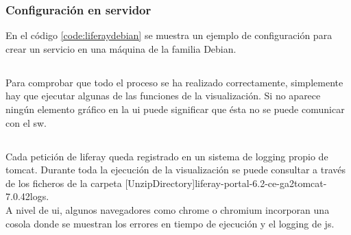 \subsubsection*{Configuración en servidor}
En el código \ref{code:liferaydebian} se muestra un ejemplo de configuración para crear un servicio en una máquina de la familia Debian.

\subsection{}
Para comprobar que todo el proceso se ha realizado correctamente, simplemente hay que ejecutar algunas de las funciones de la visualización. Si no aparece ningún elemento gráfico en la \gls{ui} puede significar que ésta no se puede comunicar con el \gls{sw}.

\subsection{}
Cada petición de \gls{liferay} queda registrado en un sistema de \gls{logging} propio de \gls{tomcat}. Durante toda la ejecución de la visualización se puede consultar a través de los ficheros de la carpeta [UnzipDirectory]\/liferay-portal-6.2-ce-ga2\/tomcat-7.0.42\/logs\/.\\ 

A nivel de \gls{ui}, algunos navegadores como \gls{chrome} o \gls{chromium} incorporan una cosola donde se muestran los errores en tiempo de ejecución y el \gls{logging} de \gls{js}.



